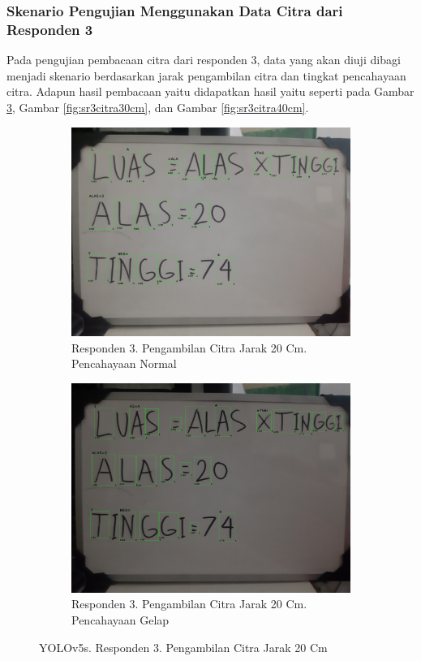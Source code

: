 \subsubsection{Skenario Pengujian Menggunakan Data Citra dari Responden 3}
\label{subsubsec:sskenarioresponden3}

Pada pengujian pembacaan citra dari responden 3, data yang akan diuji dibagi menjadi skenario berdasarkan jarak pengambilan citra dan tingkat pencahayaan citra. Adapun hasil pembacaan yaitu didapatkan hasil yaitu seperti pada Gambar \ref*{fig:sr3citra20cm}, Gambar \ref*{fig:sr3citra30cm}, dan Gambar \ref*{fig:sr3citra40cm}.

\begin{figure}[H]
  \begin{subfigure}{.5\textwidth}
    \centering
    \captionsetup{width=.8\linewidth}
    \includegraphics[width=.8\linewidth]{gambar/yolov5s/responden3/hans20cm00-result.jpg}
    \caption{Responden 3. Pengambilan Citra Jarak 20 Cm. Pencahayaan Normal}
    \label{fig:sr3tcitra20cm}
  \end{subfigure}%
  \begin{subfigure}{.5\textwidth}
    \centering
    \captionsetup{width=.8\linewidth}
    \includegraphics[width=.8\linewidth]{gambar/yolov5s/responden3/hans20cm10-result.jpg}
    \caption{Responden 3. Pengambilan Citra Jarak 20 Cm. Pencahayaan Gelap}
    \label{fig:sr3gcitra20cm}
  \end{subfigure}
  \caption{YOLOv5s. Responden 3. Pengambilan Citra Jarak 20 Cm}
  \label{fig:sr3citra20cm}
\end{figure}

